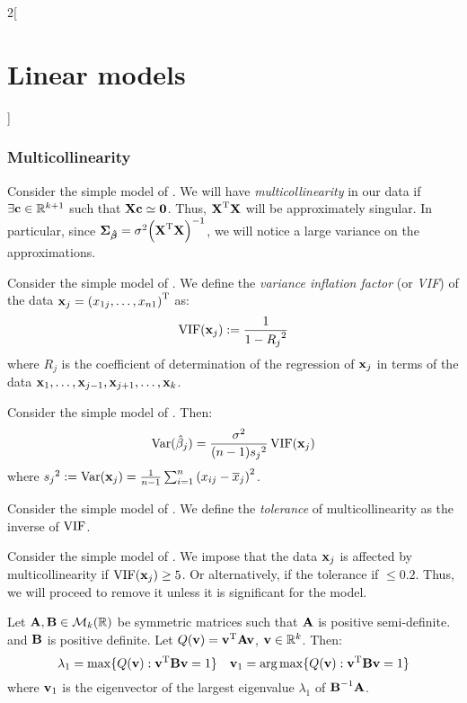 \documentclass[../../../main_math.tex]{subfiles}
\begin{document}
\begin{multicols}{2}[\section{Linear models}]
  \subsubsection{Multicollinearity}
  \begin{definition}
    Consider the simple model of . We will have \emph{multicollinearity} in our data if $\exists \boldsymbol{\mathrm{c}}\in\mathbb{R}^{k+1}$ such that $\boldsymbol{\mathrm{Xc}}\simeq \boldsymbol{\mathrm{0}}$. Thus, ${\boldsymbol{\mathrm{X}}}^{\mathrm{T}}\boldsymbol{\mathrm{X}}$ will be approximately singular. In particular, since $\boldsymbol{\mathrm{\Sigma}}_{\boldsymbol{\mathrm{\hat\beta}}}=\sigma^2{\left({\boldsymbol{\mathrm{X}}}^{\mathrm{T}}\boldsymbol{\mathrm{X}}\right)}^{-1}$, we will notice a large variance on the approximations.
  \end{definition}
  \begin{definition}
    Consider the simple model of . We define the \emph{variance inflation factor} (or \emph{VIF}) of the data $\boldsymbol{\mathrm{x}}_j={(x_{1j},\ldots,x_{n1})}^{\mathrm{T}}$ as: $$\operatorname{VIF}(\boldsymbol{\mathrm{x}}_j):=\frac{1}{1-{R_j}^2}$$ where ${R_j}$ is the coefficient of determination of the regression of $\boldsymbol{\mathrm{x}}_j$ in terms of the data $\boldsymbol{\mathrm{x}}_1,\ldots,\boldsymbol{\mathrm{x}}_{j-1},\boldsymbol{\mathrm{x}}_{j+1},\ldots,\boldsymbol{\mathrm{x}}_k$.
  \end{definition}
  \begin{lemma}
    Consider the simple model of . Then: $$\mathrm{Var}(\hat\beta_j)=\frac{\sigma^2}{(n-1) {s_j}^2}\operatorname{VIF}(\boldsymbol{\mathrm{x}}_j)$$ where ${s_j}^2:=\mathrm{Var}(\boldsymbol{\mathrm{x}}_j)=\frac{1}{n-1}\sum_{i=1}^n{(x_{ij}-\overline{x}_j)}^2$.
  \end{lemma}
  \begin{definition}
    Consider the simple model of . We define the \emph{tolerance} of multicollinearity as the inverse of $\operatorname{VIF}$.
  \end{definition}
  \begin{definition}
    Consider the simple model of .  We impose that the data $\boldsymbol{\mathrm{x}}_j$ is affected by multicollinearity if $\operatorname{VIF}(\boldsymbol{\mathrm{x}}_j)\ge 5$. Or alternatively, if the tolerance if $\leq 0.2$. Thus, we will proceed to remove it unless it is significant for the model.
  \end{definition}
  \begin{theorem}
    Let $\boldsymbol{\mathrm{A}},\boldsymbol{\mathrm{B}}\in\mathcal{M}_k(\mathbb{R})$ be symmetric matrices such that $\boldsymbol{\mathrm{A}}$ is positive semi-definite. and $\boldsymbol{\mathrm{B}}$ is positive definite. Let $Q(\boldsymbol{\mathrm{v}})={\boldsymbol{\mathrm{v}}}^{\mathrm{T}}\boldsymbol{\mathrm{Av}}$, $\boldsymbol{\mathrm{v}}\in\mathbb{R}^k$. Then:
    $$\lambda_1=\max\{Q(\boldsymbol{\mathrm{v}}):{\boldsymbol{\mathrm{v}}}^{\mathrm{T}}\boldsymbol{\mathrm{Bv}}=1\}\quad \boldsymbol{\mathrm{v}}_1=\operatorname*{arg\,max}\{Q(\boldsymbol{\mathrm{v}}):{\boldsymbol{\mathrm{v}}}^{\mathrm{T}}\boldsymbol{\mathrm{Bv}}=1\}$$
    where $\boldsymbol{\mathrm{v}}_1$ is the eigenvector of the largest eigenvalue $\lambda_1$ of $\boldsymbol{\mathrm{B}}^{-1}\boldsymbol{\mathrm{A}}$.

\end{theorem}
\end{multicols}
\end{document}
